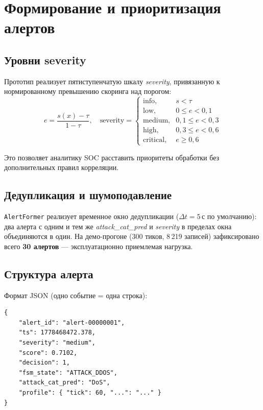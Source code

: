 \documentclass[14pt, a4paper]{extarticle}
\begin{document}
\section{Формирование и приоритизация алертов}

\subsection{Уровни severity}

Прототип реализует пятиступенчатую шкалу \emph{severity}, привязанную
к нормированному превышению скоринга над порогом:
\[
e = \frac{s(x) - \tau}{1 - \tau},
\quad
\text{severity} =
\begin{cases}
\text{info},     & s < \tau \\
\text{low},      & 0 \le e < 0{,}1 \\
\text{medium},   & 0{,}1 \le e < 0{,}3 \\
\text{high},     & 0{,}3 \le e < 0{,}6 \\
\text{critical}, & e \ge 0{,}6
\end{cases}
\]

Это позволяет аналитику SOC расставить приоритеты обработки без
дополнительных правил корреляции.

\subsection{Дедупликация и шумоподавление}

\texttt{AlertFormer} реализует временное окно дедупликации
(\(\Delta t = 5\)\,с по умолчанию): два алерта с одним и тем же
\emph{attack\_cat\_pred} и \emph{severity} в пределах окна
объединяются в один. На демо-прогоне (300 тиков, 8\,219 записей)
зафиксировано всего \textbf{30 алертов} --- эксплуатационно
приемлемая нагрузка.

\subsection{Структура алерта}

Формат JSON (одно событие = одна строка):

\begin{lstlisting}[basicstyle=\ttfamily\small]
{
    "alert_id": "alert-00000001",
    "ts": 1778468472.378,
    "severity": "medium",
    "score": 0.7102,
    "decision": 1,
    "fsm_state": "ATTACK_DDOS",
    "attack_cat_pred": "DoS",
    "profile": { "tick": 60, "...": "..." }
}
\end{lstlisting}
\end{document}

